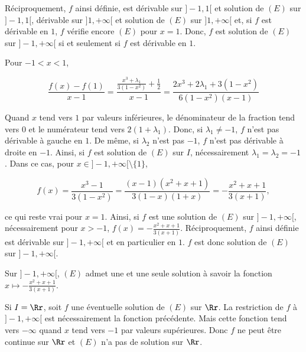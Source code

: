 {{Réciproquement, $f$ ainsi définie, est dérivable sur $]-1,1[$ et solution de $(E)$ sur $]-1,1[$, dérivable sur
$]1,+\infty[$ et solution de $(E)$ sur $]1,+\infty[$ et, si $f$ est dérivable en $1$, $f$ vérifie encore $(E)$ pour
$x=1$. Donc, $f$ est solution de $(E)$ sur $]-1,+\infty[$ si et seulement si $f$ est dérivable en $1$.

Pour $-1<x<1$,

$$\frac{f(x)-f(1)}{x-1}=\frac{\frac{x^3+\lambda_1}{3(1-x^2)}+\frac{1}{2}}{x-1}=\frac{2x^3+2\lambda_1+3(1-x^2)}
{6(1-x^2)(x-1)}$$

Quand $x$ tend vers $1$ par valeurs inférieures, le dénominateur de la fraction tend vers $0$ et le numérateur tend vers
$2(1+\lambda_1)$. Donc, si $\lambda_1\neq-1$, $f$ n'est pas dérivable à gauche en $1$. De même, si $\lambda_2$ n'est pas
$-1$, $f$ n'est pas dérivable à droite en $-1$. Ainsi, si $f$ est solution de $(E)$ sur $I$, nécessairement
$\lambda_1=\lambda_2=-1$. Dans ce cas, pour $x\in]-1,+\infty[\setminus\{1\}$,

$$f(x)=\frac{x^3-1}{3(1-x^2)}=\frac{(x-1)(x^2+x+1)}{3(1-x)(1+x)}=-\frac{x^2+x+1}{3(x+1)},$$

ce qui reste vrai pour $x=1$. Ainsi, si $f$ est une solution de $(E)$ sur $]-1,+\infty[$, nécessairement
pour $x>-1$, $f(x)=-\frac{x^2+x+1}{3(x+1)}$. Réciproquement, $f$ ainsi définie est dérivable sur $]-1,+\infty[$ et en
particulier en $1$. $f$ est donc solution de $(E)$ sur $]-1,+\infty[$.

Sur $]-1,+\infty[$, $(E)$ admet une et une seule solution à savoir la fonction $x\mapsto-\frac{x^2+x+1}{3(x+1)}$.

Si $I=\Rr$, soit $f$ une éventuelle solution de $(E)$ sur $\Rr$. La restriction de $f$ à $]-1,+\infty[$ est
nécessairement la fonction précédente. Mais cette fonction tend vers $-\infty$ quand $x$ tend vers $-1$ par valeurs
supérieures. Donc $f$ ne peut être continue sur $\Rr$ et $(E)$ n'a pas de solution sur $\Rr$.}
}